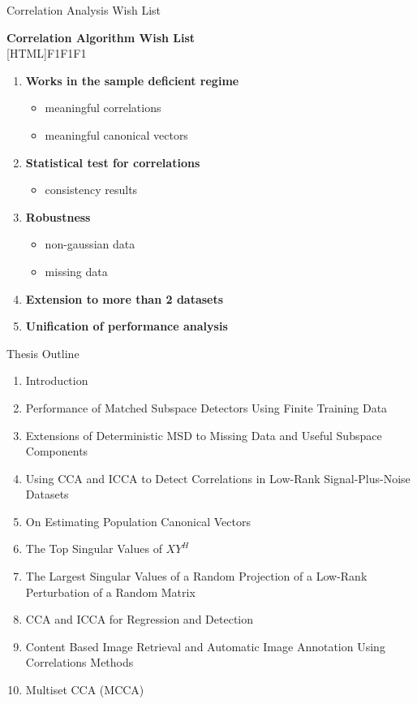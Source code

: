 \documentclass[8pt]{beamer}
\begin{document}
\begin{frame}{Correlation Analysis Wish List}

  \begin{center}
    \textbf{Correlation Algorithm Wish List}\\[1ex]
[HTML]{F1F1F1}{\parbox{0.8\textwidth}{%
    \begin{enumerate}
    \item \textbf{Works in the sample deficient regime}
      \begin{itemize}
      \item meaningful correlations
      \item meaningful canonical vectors
      \end{itemize}
    \item \textbf{Statistical test for correlations}
      \begin{itemize}
      \item consistency results
      \end{itemize}
    \item \textbf{Robustness}
      \begin{itemize}
      \item non-gaussian data
      \item missing data
      \end{itemize}
    \item \textbf{Extension to more than 2 datasets}
    \item \textbf{Unification of performance analysis}
    \end{enumerate}
}}
\end{center}

\end{frame}


\begin{frame}{Thesis Outline}

  \begin{enumerate}
  \item Introduction
  \item Performance of Matched Subspace Detectors Using Finite Training Data
  \item Extensions of Deterministic MSD to Missing Data and Useful Subspace Components
  \item Using CCA and ICCA to Detect Correlations in Low-Rank Signal-Plus-Noise Datasets
  \item On Estimating Population Canonical Vectors
  \item The Top Singular Values of $XY^H$
  \item The Largest Singular Values of a Random Projection of a Low-Rank Perturbation of a
    Random Matrix
  \item CCA and ICCA for Regression and Detection
  \item Content Based Image Retrieval and Automatic Image Annotation Using Correlations Methods
  \item Multiset CCA (MCCA)
  \end{enumerate}

\end{frame}
\end{document}
